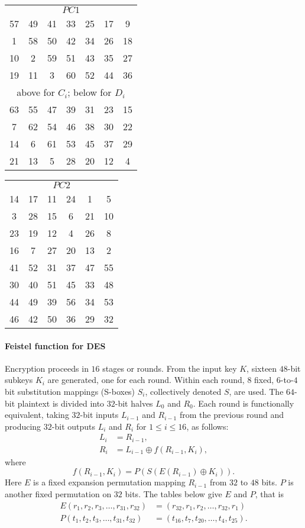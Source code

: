 \documentclass[a4paper, 11pt, openany]{book}
\begin{document}
\begin{tabular}{ccccccc}
\multicolumn{7}{c}{$PC1$}\\
57 & 49 & 41 & 33 & 25 & 17 & 9\\
1 & 58 & 50 & 42 & 34 & 26 & 18\\
10 & 2 & 59 & 51 & 43 & 35 & 27\\
19 & 11 & 3 & 60 & 52 & 44 & 36\\
\multicolumn{7}{c}{above for $C_i$; below for $D_i$}\\
63 & 55 & 47 & 39 & 31 & 23 & 15\\
7 & 62 & 54 & 46 & 38 & 30 & 22\\
14 & 6 & 61 & 53 & 45 & 37 & 29\\
21 & 13 & 5 & 28 & 20 & 12 & 4
\end{tabular}
\hfill
\begin{tabular}{cccccc}
\multicolumn{6}{c}{$PC2$}\\
14 & 17 & 11 & 24 & 1 & 5\\
3 & 28 & 15 & 6 & 21 & 10\\
23 & 19 & 12 & 4 & 26 & 8\\
16 & 7 & 27 & 20 & 13 & 2\\
41 & 52 & 31 & 37 & 47 & 55\\
30 & 40 & 51 & 45 & 33 & 48\\
44 & 49 & 39 & 56 & 34 & 53\\
46 & 42 & 50 & 36 & 29 & 32
\end{tabular}



\paragraph{Feistel function for DES}

Encryption proceeds in $16$ stages or rounds. From the input key $K$, sixteen $48$-bit
subkeys $K_i$ are generated, one for each round. Within each round, $8$ fixed, $6$-to-$4$ bit substitution mappings (S-boxes) $S_i$, collectively denoted $S$, are used. The $64$-bit
plaintext is divided into $32$-bit halves $L_0$ and $R_0$. Each round is functionally equivalent, taking $32$-bit inputs $L_{i-1}$ and $R_{i-1}$ from the previous round and producing $32$-bit outputs
$L_i$ and $R_i$ for $1 \le i \le 16$, as follows:
\begin{align*}
    L_i &= R_{i-1},\\
    R_i &= L_{i-1} \oplus f(R_{i-1}, K_i),
\end{align*}
where
\[
    f(R_{i-1}, K_i) = P( S( E( R_{i-1} ) \oplus K_i ) ).
\]
Here $E$ is a fixed expansion permutation mapping $R_{i-1}$ from $32$ to $48$ bits. $P$ is another fixed permutation on $32$ bits. The tables below give $E$ and $P$, that is
\begin{align*}
    E(r_1, r_2, r_3, \dots, r_{31}, r_{32}) &= (r_{32}, r_1, r_2, \dots, r_{32}, r_1)\\
    P(t_1, t_2, t_3, \dots, t_{31}, t_{32}) &= (t_{16}, t_7, t_{20}, \dots, t_4, t_{25}).
\end{align*}
\end{document}
